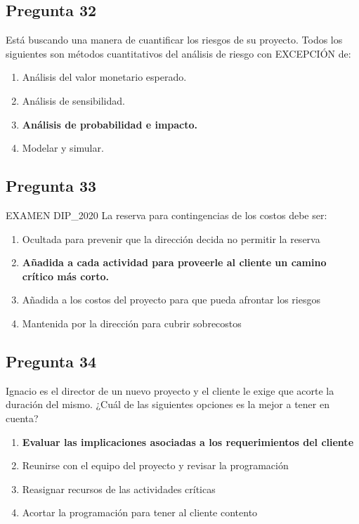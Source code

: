 \documentclass[11pt,a4paper]{article}
\begin{document}
\subsection*{Pregunta 32}
Está buscando una manera de cuantificar los riesgos de su proyecto. Todos los siguientes son métodos cuantitativos del análisis de riesgo con EXCEPCIÓN de:

\begin{enumerate}[label=\alph*)]
  \item Análisis del valor monetario esperado.
  \item Análisis de sensibilidad.
  \item \textbf{Análisis de probabilidad e impacto.}
  \item Modelar y simular.
\end{enumerate}

\subsection*{Pregunta 33}
EXAMEN DIP\_2020 La reserva para contingencias de los costos debe ser:

\begin{enumerate}[label=\alph*)]
  \item Ocultada para prevenir que la dirección decida no permitir la reserva
  \item \textbf{Añadida a cada actividad para proveerle al cliente un camino crítico más corto.}
  \item Añadida a los costos del proyecto para que pueda afrontar los riesgos
  \item Mantenida por la dirección para cubrir sobrecostos
\end{enumerate}

\subsection*{Pregunta 34}
Ignacio es el director de un nuevo proyecto y el cliente le exige que acorte la duración del mismo. ¿Cuál de las siguientes opciones es la mejor a tener en cuenta?

\begin{enumerate}[label=\alph*)]
  \item \textbf{Evaluar las implicaciones asociadas a los requerimientos del cliente}
  \item Reunirse con el equipo del proyecto y revisar la programación
  \item Reasignar recursos de las actividades críticas
  \item Acortar la programación para tener al cliente contento
\end{enumerate}
\end{document}

